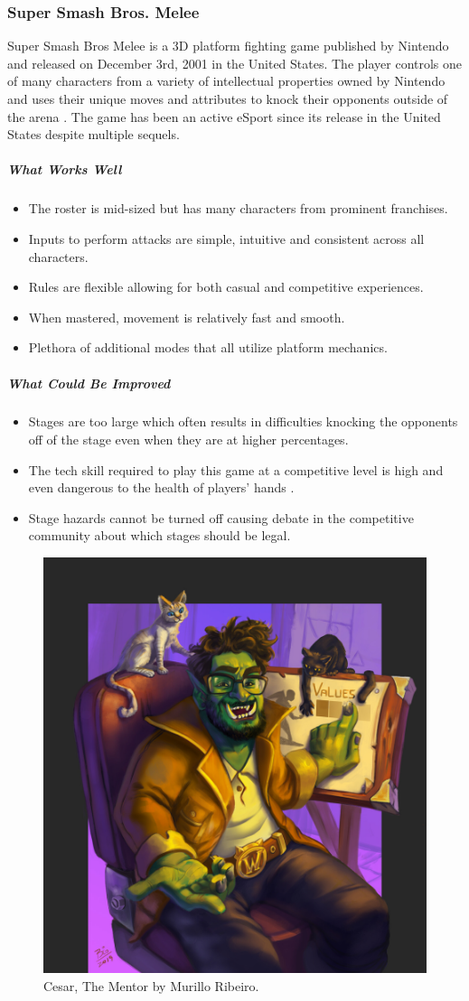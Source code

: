 \subsubsection{Super Smash Bros. Melee}

Super Smash Bros Melee is a 3D platform fighting game published by Nintendo and released on December 3rd, 2001 in the United States. The player controls one of many characters from a variety of intellectual properties owned by Nintendo and uses their unique moves and attributes to knock their opponents outside of the arena \autocite{sakurai_super_2001}. The game has been an active eSport since its release in the United States despite multiple sequels.

\subparagraph{What Works Well}

\begin{itemize}
    \item The roster is mid-sized but has many characters from prominent franchises.
    \item Inputs to perform attacks are simple, intuitive and consistent across all characters.
    \item Rules are flexible allowing for both casual and competitive experiences.
    \item When mastered, movement is relatively fast and smooth.
    \item Plethora of additional modes that all utilize platform mechanics.
\end{itemize}

\subparagraph{What Could Be Improved}

\begin{itemize}
    \item Stages are too large which often results in difficulties knocking the opponents off of the stage even when they are at higher percentages.
    \item The tech skill required to play this game at a competitive level is high and even dangerous to the health of players' hands \autocite{lee_haxs_2016}.
    \item Stage hazards cannot be turned off causing debate in the competitive community about which stages should be legal.
\end{itemize}

\begin{figure}[h!]
    \centering
    \includegraphics[width=0.4\linewidth]{images/characters-civilian.jpg}
    \caption{Cesar, The Mentor by Murillo Ribeiro. \nocite{ribeiro_cesar_2019}}
\end{figure}

